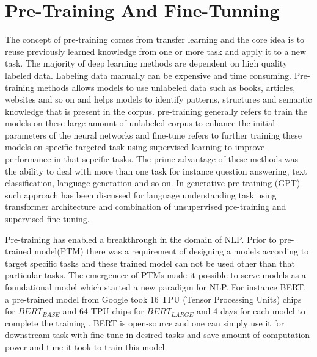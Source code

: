 \section{Pre-Training And Fine-Tunning}

The concept of pre-training comes from transfer learning \cite{Transfer_learning} and the core idea is to reuse previously learned knowledge from one or more task and apply it to a new task. The majority of deep learning methods are dependent on high quality labeled data. Labeling data manually can be expensive and time consuming. Pre-training methods allows models to use unlabeled data such as books, articles, websites and so on and helps models to identify patterns, structures and semantic knowledge that is present in the corpus. pre-training generally refers to train the models on these large amount of unlabeled corpus to enhance the initial parameters of the neural networks and fine-tune refers to further training these models on specific targeted task using supervised learning to improve performance in that sepcific tasks. The prime advantage of these methods was the ability to deal with more than one task for instance question answering, text classification, language generation and so on. In generative pre-training (GPT) \cite{radford2018improving} such approach has been discussed for language understanding task using transformer architecture and combination of unsupervised pre-training and supervised fine-tuning.

Pre-training has enabled a breakthrough in the domain of NLP. Prior to pre-trained model(PTM) there was a requirement of designing a models according to target specific tasks and these trained model can not be used other than that particular tasks. The emergenece of PTMs made it possible to serve models as a foundational model which started a new paradigm for NLP. For instance BERT, a pre-trained model from Google took 16 TPU (Tensor Processing Units) chips for \(BERT_{BASE}\) and 64 TPU chips for \(BERT_{LARGE}\) and 4 days for each model to complete the training \cite{devlin2018bert}. BERT is open-source and one can simply use it for downstream task with fine-tune in desired tasks and save amount of computation power and time it took to train this model.
